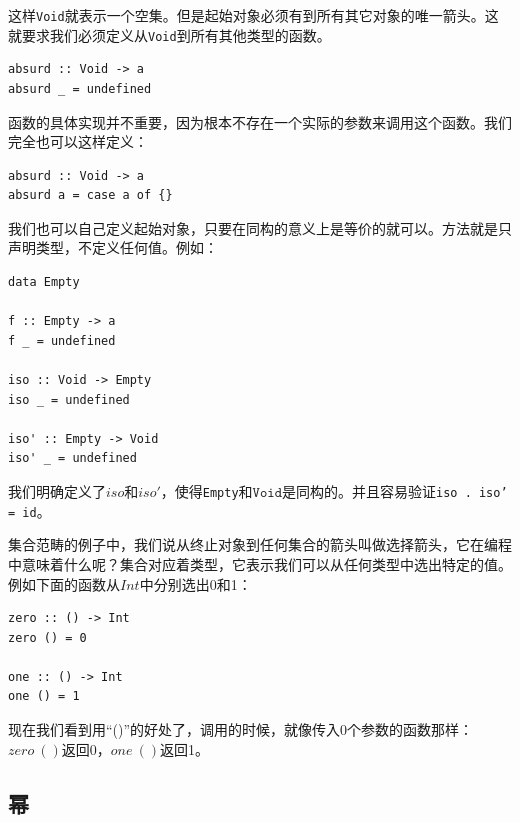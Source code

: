 \documentclass[b5paper]{ctexart}
\begin{document}
\begin{example}
这样\texttt{Void}就表示一个空集。但是起始对象必须有到所有其它对象的唯一箭头。这就要求我们必须定义从\texttt{Void}到所有其他类型的函数。

\begin{lstlisting}
absurd :: Void -> a
absurd _ = undefined
\end{lstlisting}

函数的具体实现并不重要，因为根本不存在一个实际的参数来调用这个函数。我们完全也可以这样定义：

\begin{lstlisting}
absurd :: Void -> a
absurd a = case a of {}
\end{lstlisting}

我们也可以自己定义起始对象，只要在同构的意义上是等价的就可以。方法就是只声明类型，不定义任何值。例如：

\begin{lstlisting}
data Empty

f :: Empty -> a
f _ = undefined

iso :: Void -> Empty
iso _ = undefined

iso' :: Empty -> Void
iso' _ = undefined
\end{lstlisting}

我们明确定义了$iso$和$iso'$，使得\texttt{Empty}和$\texttt{Void}$是同构的。并且容易验证\texttt{iso . iso' = id}。

集合范畴的例子中，我们说从终止对象到任何集合的箭头叫做选择箭头，它在编程中意味着什么呢？集合对应着类型，它表示我们可以从任何类型中选出特定的值。例如下面的函数从$Int$中分别选出0和1：

\begin{lstlisting}
zero :: () -> Int
zero () = 0

one :: () -> Int
one () = 1
\end{lstlisting}

现在我们看到用“()”的好处了，调用的时候，就像传入0个参数的函数那样：$zero\ ()$返回0，$one\ ()$返回1。
\end{example}

\begin{Exercise}
\end{Exercise}

\subsection{幂}
 
\end{document}
